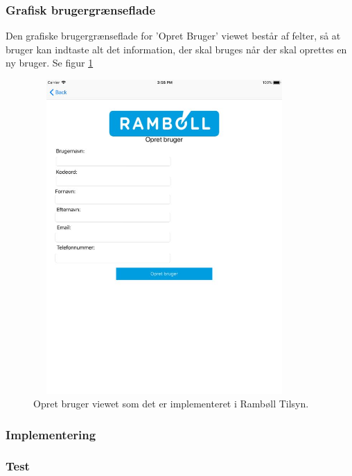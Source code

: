 \subsubsection{Grafisk brugergrænseflade}
Den grafiske brugergrænseflade for 'Opret Bruger' viewet består af felter, så at bruger kan indtaste alt det information, der skal bruges når der skal oprettes en ny bruger. Se figur \ref{fig:OpretBrugerView}
\begin{figure}[H] %
	\centering
	\includegraphics[height=12cm, width=10cm]{Design/Applikation/OpretBruger/OpretBrugerView}
	\caption{Opret bruger viewet som det er implementeret i Rambøll Tilsyn.}
	\label{fig:OpretBrugerView}
\end{figure}

\subsubsection{Implementering}

\subsubsection{Test}

\clearpage